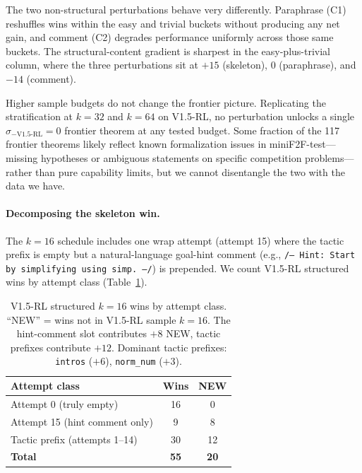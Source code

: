 \documentclass{article}
\begin{document}
The two non-structural perturbations behave very differently. Paraphrase (C1) reshuffles wins within the easy and trivial buckets without producing any net gain, and comment (C2) degrades performance uniformly across those same buckets. The structural-content gradient is sharpest in the easy-plus-trivial column, where the three perturbations sit at $+15$ (skeleton), $0$ (paraphrase), and $-14$ (comment).

Higher sample budgets do not change the frontier picture. Replicating the stratification at $k{=}32$ and $k{=}64$ on V1.5-RL, no perturbation unlocks a single $\sigma_{-\text{V1.5-RL}}{=}0$ frontier theorem at any tested budget. Some fraction of the 117 frontier theorems likely reflect known formalization issues in miniF2F-test---missing hypotheses or ambiguous statements on specific competition problems---rather than pure capability limits, but we cannot disentangle the two with the data we have.

\paragraph{Decomposing the skeleton win.}
The $k{=}16$ schedule includes one wrap attempt (attempt 15) where the tactic prefix is empty but a natural-language goal-hint comment (e.g., \texttt{/-- Hint: Start by simplifying using simp. --/}) is prepended. We count V1.5-RL structured wins by attempt class (Table~\ref{tab:attempt_class}).

\begin{table}[t]
\centering
\small
\begin{tabular}{lcc}
\toprule
\textbf{Attempt class} & \textbf{Wins} & \textbf{NEW} \\
\midrule
Attempt 0 (truly empty)           & 16 & 0  \\
Attempt 15 (hint comment only)    & 9  & 8  \\
Tactic prefix (attempts 1--14)    & 30 & 12 \\
\midrule
\textbf{Total}                    & \textbf{55} & \textbf{20} \\
\bottomrule
\end{tabular}
\caption{V1.5-RL structured $k{=}16$ wins by attempt class. ``NEW'' = wins not in V1.5-RL sample $k{=}16$. The hint-comment slot contributes $+8$ NEW, tactic prefixes contribute $+12$. Dominant tactic prefixes: \texttt{intros} ($+6$), \texttt{norm\_num} ($+3$).}
\label{tab:attempt_class}
\end{table}
\end{document}
